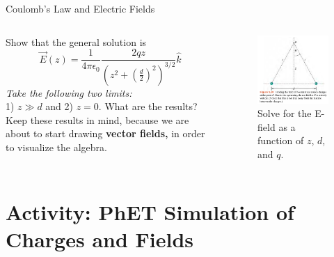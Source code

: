 \documentclass{beamer}
\begin{document}
\begin{frame}{Coulomb’s Law and Electric Fields}
\small
\begin{columns}[T]
\begin{column}{0.5\textwidth}
Show that the general solution is
\begin{equation}
\vec{E}(z) = \frac{1}{4\pi\epsilon_0} \frac{2qz}{\left(z^2+\left(\frac{d}{2}\right)^2\right)^{3/2}} \hat{k}
\end{equation}
\textit{Take the following two limits:} \\ 1) $z \gg d$ and 2) $z=0$.  What are the results? \\ \vspace{0.5cm}
Keep these results in mind, because we are about to start drawing \textbf{vector fields,} in order to visualize the algebra.
\end{column}
\begin{column}{0.5\textwidth}
\begin{figure}
\includegraphics[width=\textwidth]{figures/twoChargesZ.png}
\caption{\label{fig:twoChargesZ2} Solve for the E-field as a function of $z$, $d$, and $q$.}
\end{figure}
\end{column}
\end{columns}
\end{frame}

\section{Activity: PhET Simulation of Charges and Fields}
\end{document}
